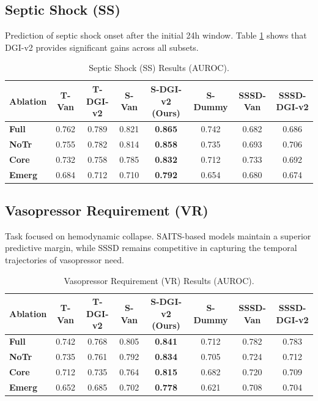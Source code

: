 \subsection{Septic Shock (SS)}
Prediction of septic shock onset after the initial 24h window. Table \ref{tab:ss_complete} shows that DGI-v2 provides significant gains across all subsets.

\begin{table}[t]
\centering
\caption{Septic Shock (SS) Results (AUROC).}
\label{tab:ss_complete}
\begin{tabular}{lccccccc}
\toprule
\textbf{Ablation} & \textbf{T-Van} & \textbf{T-DGI-v2} & \textbf{S-Van} & \textbf{S-DGI-v2 (Ours)} & \textbf{S-Dummy} & \textbf{SSSD-Van} & \textbf{SSSD-DGI-v2} \\
\midrule
\textbf{Full}  & 0.762 & 0.789 & 0.821 & \textbf{0.865} & 0.742 & 0.682 & 0.686 \\
\textbf{NoTr}  & 0.755 & 0.782 & 0.814 & \textbf{0.858} & 0.735 & 0.693 & 0.706 \\
\textbf{Core}  & 0.732 & 0.758 & 0.785 & \textbf{0.832} & 0.712 & 0.733 & 0.692 \\
\textbf{Emerg} & 0.684 & 0.712 & 0.710 & \textbf{0.792} & 0.654 & 0.680 & 0.674 \\
\bottomrule
\end{tabular}
\end{table}

\subsection{Vasopressor Requirement (VR)}
Task focused on hemodynamic collapse. SAITS-based models maintain a superior predictive margin, while SSSD remains competitive in capturing the temporal trajectories of vasopressor need.

\begin{table}[t]
\centering
\caption{Vasopressor Requirement (VR) Results (AUROC).}
\label{tab:vr_complete}
\begin{tabular}{lccccccc}
\toprule
\textbf{Ablation} & \textbf{T-Van} & \textbf{T-DGI-v2} & \textbf{S-Van} & \textbf{S-DGI-v2 (Ours)} & \textbf{S-Dummy} & \textbf{SSSD-Van} & \textbf{SSSD-DGI-v2} \\
\midrule
\textbf{Full}  & 0.742 & 0.768 & 0.805 & \textbf{0.841} & 0.712 & 0.782 & 0.783 \\
\textbf{NoTr}  & 0.735 & 0.761 & 0.792 & \textbf{0.834} & 0.705 & 0.724 & 0.712 \\
\textbf{Core}  & 0.712 & 0.735 & 0.764 & \textbf{0.815} & 0.682 & 0.720 & 0.709 \\
\textbf{Emerg} & 0.652 & 0.685 & 0.702 & \textbf{0.778} & 0.621 & 0.708 & 0.704 \\
\bottomrule
\end{tabular}
\end{table}

